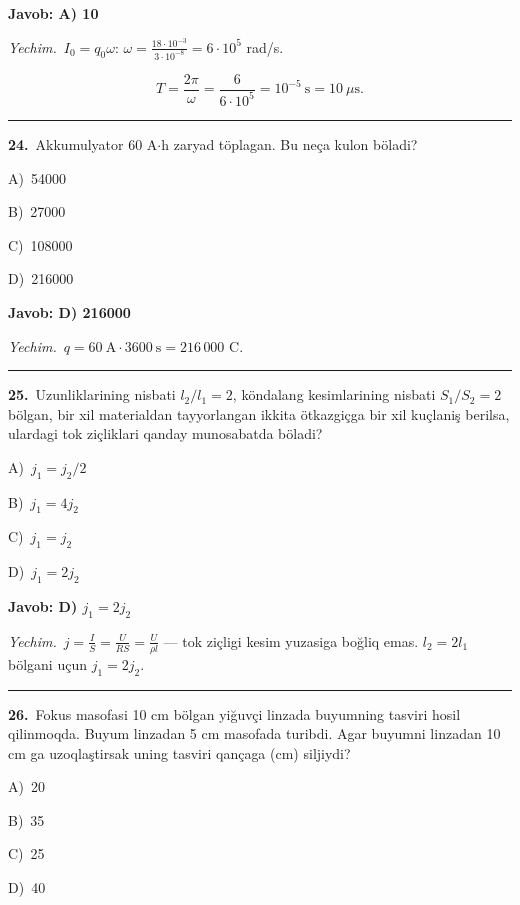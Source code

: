 \documentclass[11pt,a4paper]{article}
\newcommand{\opt}[2]{\hspace*{4mm}#1)\ #2\par}
\begin{document}
\noindent\colorbox{gray!12}{\parbox{\dimexpr\linewidth-2\fboxsep}{\textbf{Javob: A) 10}}}\par\smallskip
\noindent\textit{Yechim.}\ $I_0=q_0\omega$: $\omega=\frac{18\cdot10^{-3}}{3\cdot10^{-8}}=6\cdot10^5$ rad/s.\par
\[T=\frac{2\pi}{\omega}=\frac{6}{6\cdot10^5}=10^{-5}\ \text{s}=10\ \mu\text{s}.\]\par\medskip\hrule\medskip
{}\noindent\begin{minipage}{\linewidth}
\textbf{24.}\ Akkumulyator 60 A$\cdot$h zaryad töplagan. Bu neça kulon böladi?\par\smallskip
\opt{A}{54000}
\opt{B}{27000}
\opt{C}{108000}
\opt{D}{216000}
\end{minipage}\vspace{2pt}\par
\noindent\colorbox{gray!12}{\parbox{\dimexpr\linewidth-2\fboxsep}{\textbf{Javob: D) 216000}}}\par\smallskip
\noindent\textit{Yechim.}\ $q=60\ \text{A}\cdot3600\ \text{s}=216\,000$ C.\par\par\medskip\hrule\medskip
{}\noindent\begin{minipage}{\linewidth}
\textbf{25.}\ Uzunliklarining nisbati $l_2/l_1=2$, köndalang kesimlarining nisbati $S_1/S_2=2$ bölgan, bir xil materialdan tayyorlangan ikkita ötkazgiçga bir xil kuçlaniş berilsa, ulardagi tok ziçliklari qanday munosabatda böladi?\par\smallskip
\opt{A}{$j_1=j_2/2$}
\opt{B}{$j_1=4j_2$}
\opt{C}{$j_1=j_2$}
\opt{D}{$j_1=2j_2$}
\end{minipage}\vspace{2pt}\par
\noindent\colorbox{gray!12}{\parbox{\dimexpr\linewidth-2\fboxsep}{\textbf{Javob: D) $j_1=2j_2$}}}\par\smallskip
\noindent\textit{Yechim.}\ $j=\frac{I}{S}=\frac{U}{RS}=\frac{U}{\rho l}$ — tok ziçligi kesim yuzasiga boğliq emas. $l_2=2l_1$ bölgani uçun $j_1=2j_2$.\par\par\medskip\hrule\medskip
{}\noindent\begin{minipage}{\linewidth}
\textbf{26.}\ Fokus masofasi 10 cm bölgan yiğuvçi linzada buyumning tasviri hosil qilinmoqda. Buyum linzadan 5 cm masofada turibdi. Agar buyumni linzadan 10 cm ga uzoqlaştirsak uning tasviri qançaga (cm) siljiydi?\par\smallskip
\opt{A}{20}
\opt{B}{35}
\opt{C}{25}
\opt{D}{40}
\end{minipage}\vspace{2pt}\par
\end{document}
